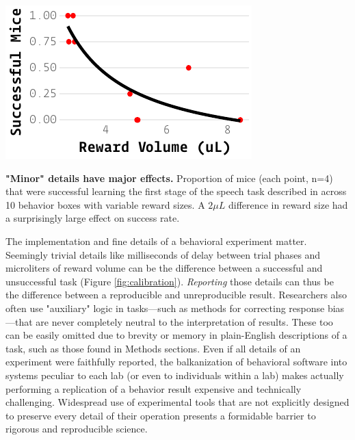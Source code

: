 \begin{marginfigure}[1.75cm]
\includegraphics[]{figures/calibration_warning.pdf}
\caption{\textbf{"Minor" details have major effects.} Proportion of mice (each point, n=4) that were successful learning the first stage of the speech task described in \citep{saundersMiceCanLearn2019} across 10 behavior boxes with variable reward sizes. A $2 \mu L$ difference in reward size had a surprisingly large effect on success rate.}
\label{fig:calibration}
\end{marginfigure}

The implementation and fine details of a behavioral experiment matter. Seemingly trivial details like milliseconds of delay between trial phases and microliters of reward volume can be the difference between a successful and unsuccessful task (Figure \ref{fig:calibration}). \textit{Reporting} those details can thus be the difference between a reproducible and unreproducible result.  Researchers also often use "auxiliary" logic in tasks---such as methods for correcting response bias---that are never completely neutral to the interpretation of results. These too can be easily omitted due to brevity or memory in plain-English descriptions of a task, such as those found in Methods sections. Even if all details of an experiment were faithfully reported, the balkanization of behavioral software into systems peculiar to each lab (or even to individuals within a lab) makes actually performing a replication of a behavior result expensive and technically challenging. Widespread use of experimental tools that are not explicitly designed to preserve every detail of their operation presents a formidable barrier to rigorous and reproducible science\citep{wallReliabilityStartsExperimental2019}.

